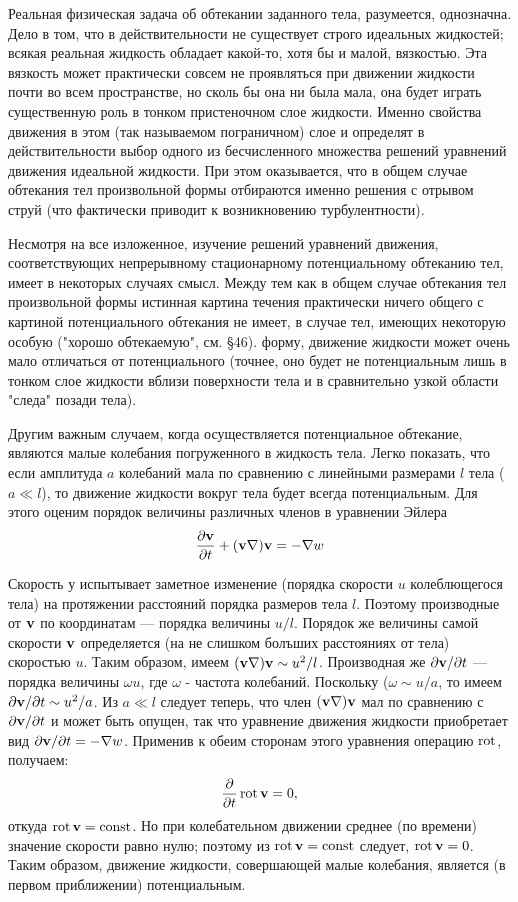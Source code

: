 Реальная физическая задача об обтекании заданного тела, разумеется, однозначна.
Дело в том, что в действительности не существует строго идеальных жидкостей;
всякая реальная жидкость обладает какой-то, хотя бы и малой, вязкостью. Эта
вязкость может практически совсем не проявляться при движении жидкости почти во
всем пространстве, но сколь бы она ни была мала, она будет играть существенную
роль в тонком пристеночном слое жидкости. Именно свойства движения в этом (так
называемом пограничном) слое и определят в действительности выбор одного из
бесчисленного множества решений уравнений движения идеальной жидкости. При этом
оказывается, что в общем случае обтекания тел произвольной формы отбираются
именно решения с отрывом струй (что фактически приводит к возникновению
турбулентности).

Несмотря на все изложенное, изучение решений уравнений движения, соответствующих
непрерывному стационарному потенциальному обтеканию тел, имеет в некоторых
случаях смысл. Между тем как в общем случае обтекания тел произвольной формы
истинная картина течения практически ничего общего с картиной потенциального
обтекания не имеет, в случае тел, имеющих некоторую особую ("хорошо обтекаемую",
см. \S46). форму, движение жидкости может очень мало отличаться от
потенциального (точнее, оно будет не потенциальным лишь в тонком слое жидкости
вблизи поверхности тела и в сравнительно узкой области "следа" позади тела).

Другим важным случаем, когда осуществляется потенциальное обтекание, являются
малые колебания погруженного в жидкость тела. Легко показать, что если амплитуда
$a$ колебаний мала по сравнению с линейными размерами $l$ тела ($a\ll l$), то
движение жидкости вокруг тела будет всегда потенциальным. Для этого оценим
порядок величины различных членов в уравнении Эйлера
\[
   \frac{\partial{{ \mathbf{v} }}}{\partial{t}}+({\mathbf{v}} \nabla) {\mathbf{v}} = - \nabla w
\]

Скорость у испытывает заметное изменение (порядка скорости $u$ колеблющегося
тела) на протяжении расстояний порядка размеров тела $l$. Поэтому производные от
${\mathbf{v}}$ по координатам — порядка величины $u/l$. Порядок же величины самой
скорости ${\mathbf{v}}$ определяется (на не слишком болъших расстояниях от тела)
скоростью $u$. Таким образом, имеем $({\mathbf{v}} \nabla) {\mathbf{v}} \sim u^2/l$. Производная же
$\partial{{ \mathbf{v} }}/\partial{t}$ — порядка величины $\omega u$, где $\omega$ -
частота колебаний. Поскольку ($\omega \sim u/a$, то имеем $\partial { \mathbf{v} }/\partial
t \sim u^2/a$. Из $a \ll l$ следует теперь, что член $({\mathbf{v}} \nabla) {\mathbf{v}}$ мал по сравнению с
$\partial { \mathbf{v} }/\partial t$ и может быть опущен, так что уравнение движения
жидкости приобретает вид $\partial { \mathbf{v} }/\partial t = - \nabla w$. Применив к
обеим сторонам этого уравнения операцию $\mathop{\mathrm{rot}}\nolimits$, получаем:
\[
   \frac{\partial}{\partial t} \mathop{\mathrm{rot}}\nolimits { \mathbf{v} } = 0,
\]
откуда $\mathop{\mathrm{rot}}\nolimits { \mathbf{v} } = \mathop{\mathrm{const}}\nolimits$. Но при колебательном движении среднее (по времени)
значение скорости равно нулю; поэтому из $\mathop{\mathrm{rot}}\nolimits{ \mathbf{v} } = \mathop{\mathrm{const}}\nolimits$ следует, $\mathop{\mathrm{rot}}\nolimits{ \mathbf{v} } =
0$. Таким образом, движение жидкости, совершающей малые колебания, является (в
первом приближении) потенциальным.

